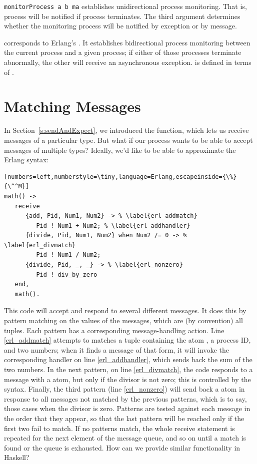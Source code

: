 \documentclass[preprint]{sigplanconf}
\begin{document}
\noindent
\lstinline!monitorProcess a b ma! establishes unidirectional process monitoring. That is, process  will be notified if process  terminates. The third argument determines whether the monitoring process  will be notified by exception or by message.

 corresponds to Erlang's . It establishes bidirectional process monitoring between the current process and a given process; if either of those processes terminate abnormally, the other will receive an asynchronous exception.  is defined in terms of . 

\section{Matching Messages}
\label{s:matching}

In Section~\ref{s:sendAndExpect}, we introduced the  function, which lets us receive messages of a particular type. But what if our process wants to be able to accept messages of multiple types? Ideally, we'd like to be able to approximate the Erlang  syntax:
\needspace{10ex}
\begin{lstlisting}[numbers=left,numberstyle=\tiny,language=Erlang,escapeinside={\%}{\^^M}]
math() ->
   receive
      {add, Pid, Num1, Num2} -> % \label{erl_addmatch}
         Pid ! Num1 + Num2; % \label{erl_addhandler}
      {divide, Pid, Num1, Num2} when Num2 /= 0 -> % \label{erl_divmatch}
         Pid ! Num1 / Num2;
      {divide, Pid, _, _} -> % \label{erl_nonzero}
         Pid ! div_by_zero
   end,
   math().
\end{lstlisting}
\label{erl_math}

This code will accept and respond to several different messages. It does this by pattern matching on the values of the messages, which are (by convention) all tuples. Each pattern has a corresponding message-handling action. 
Line \ref{erl_addmatch} attempts to matches a tuple containing the atom , a process ID, and two numbers; when it finds a message of that form, it will invoke the corresponding handler on line \ref{erl_addhandler}, which sends back the sum of the two numbers. 
In the next pattern, on line \ref{erl_divmatch}, the code responds to a message with a  atom, but only if the divisor is not zero; this is controlled by the  syntax. 
Finally, the third pattern (line \ref{erl_nonzero}) will send back a  atom in response to all messages not matched by the previous patterns, which is to say, those cases when the divisor is zero.
Patterns are tested against each message in the order that they appear, so that the last pattern will be reached only if the first two fail to match.
If no patterns match, the whole receive statement is repeated for the next element of the message queue, and so on until a match is found or the queue is exhausted.
How can we provide similar functionality in Haskell?
\end{document}
